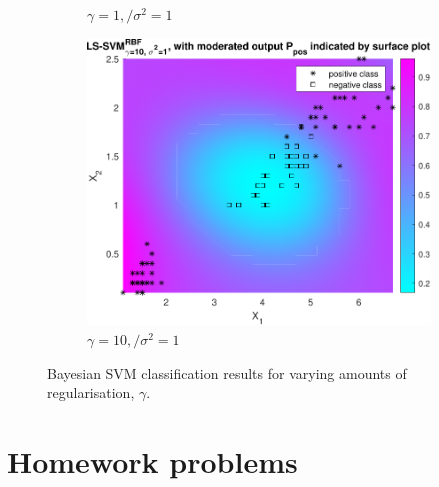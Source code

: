 \documentclass{article}
\begin{document}
\begin{figure}[h]
\begin{subfigure}[b]{0.3\textwidth}
                    \caption{$\gamma = 1,/ \sigma^2 = 1$}
                     \label{fig:bayes_5}
                 \end{subfigure}
                 \hfill
                 \begin{subfigure}[b]{0.3\textwidth}
                     \centering
                     \includegraphics[width=\textwidth]{Assignment 1/figures/bayes_rbf_gamma_10_sig2_1.pdf}
                    \caption{$\gamma = 10,/ \sigma^2 = 1$}
                     \label{fig:bayes_6}
                 \end{subfigure}
                \caption{Bayesian SVM classification results for varying amounts of regularisation, $\gamma$.}
                \label{fig:bayes_fig_gamma}
            \end{figure}
        
\section{Homework problems}
\end{document}
